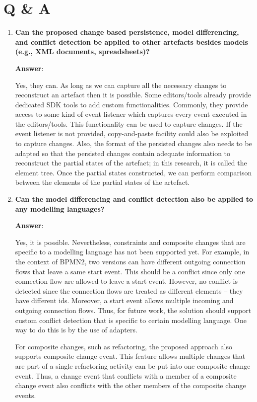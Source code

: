 \chapter{Q \& A}
\label{sec:qna}

\begin{enumerate}
  \item \textbf{Can the proposed change based persistence, model differencing, and conflict detection be applied to other artefacts besides models (e.g., XML documents, spreadsheets)?}
  
  \textbf{Answer}:
  
  Yes, they can. As long as we can capture all the necessary changes to reconstruct an artefact then it is possible. Some editors/tools already provide dedicated SDK tools to add custom functionalities.  Commonly, they provide access to some kind of event listener which captures every event executed in the editors/tools. This functionality can be used to capture changes. If the event listener is not provided, copy-and-paste facility could also be exploited to capture changes. Also, the format of the persisted changes also needs to be adapted so that the persisted changes contain adequate information to reconstruct the partial states of the artefact; in this research, it is called the element tree. Once the partial states constructed, we can perform comparison between the elements of the partial states of the artefact.
  
  \item \textbf{Can the model differencing and conflict detection also be applied to any modelling languages?}
  
  \textbf{Answer}:
  
  Yes, it is possible. Nevertheless, constraints and composite changes that are specific to a modelling language has not been supported yet. For example, in the context of BPMN2, two versions can have different outgoing connection flows that leave a same start event. This should be a conflict since only one connection flow are allowed to leave a start event. However, no conflict is detected since the connection flows are treated as different elements -- they have different ids. Moreover, a start event allows multiple incoming and outgoing connection flows. Thus, for future work, the solution should support custom conflict detection that is specific to certain modelling language. One way to do this is by the use of adapters.
  
  For composite changes, such as refactoring, the proposed approach also supports composite change event. This feature allows multiple changes that are part of a single refactoring activity can be put into one composite change event. Thus, a change event that conflicts with a member of a composite change event also conflicts with the other members of the composite change events.
  

\end{enumerate}
